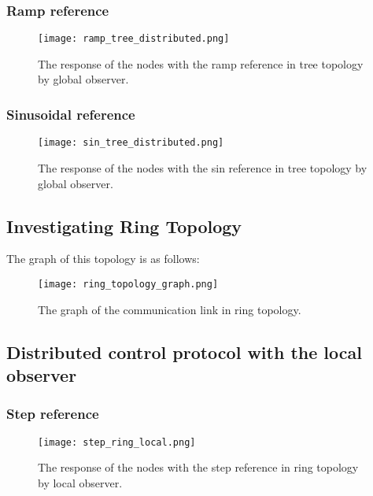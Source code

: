 \subsubsection{Ramp reference}
\begin{figure}[H] %
    \centering
    \texttt{[image: ramp\_tree\_distributed.png]} %
    \caption{The response of the nodes with the ramp reference in tree topology by global observer.}
\end{figure}


\subsubsection{Sinusoidal reference}
\begin{figure}[H] %
    \centering
    \texttt{[image: sin\_tree\_distributed.png]} %
    \caption{The response of the nodes with the sin reference in tree topology by global observer.}
\end{figure}


\subsection{Investigating Ring Topology}
The graph of this topology is as follows:
\begin{figure}[H] %
    \centering
    \texttt{[image: ring\_topology\_graph.png]} %
    \caption{The graph of the communication link in ring topology.}
\end{figure}

\subsection{Distributed control protocol with the local observer}
\subsubsection{Step reference}
\begin{figure}[H] %
    \centering
    \texttt{[image: step\_ring\_local.png]} %
    \caption{The response of the nodes with the step reference in ring topology by local observer.}
\end{figure}

